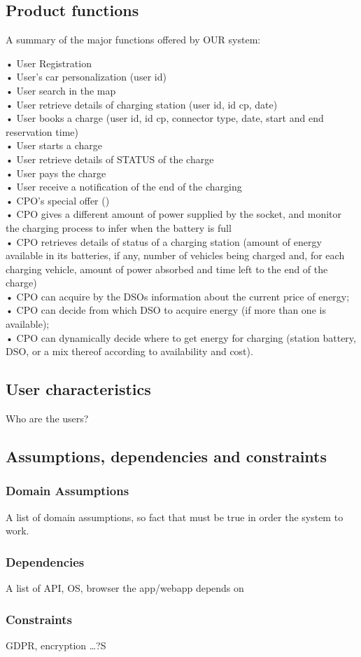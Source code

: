 \subsection{Product functions}
A summary of the major functions offered by OUR system:

• User Registration \\
• User's car personalization  (user id)\\
• User search in the map\\
• User retrieve details of charging station (user id, id cp, date)\\
• User books a charge (user id, id cp, connector type, date, start and end reservation time)\\
• User starts a charge\\
• User retrieve details of STATUS of the charge\\
• User pays the charge \\
• User receive a notification of the end of the charging\\
• CPO's special offer ()\\
• CPO gives a different amount of power supplied by the socket, and monitor
the charging process to infer when the battery is full\\
• CPO retrieves details of status of a charging station (amount of energy available 
in its batteries, if any, number of vehicles being charged and, for each charging vehicle, amount of power
absorbed and time left to the end of the charge)\\
• CPO can acquire by the DSOs information about the current price of energy;\\
• CPO can decide from which DSO to acquire energy (if more than one is available);\\
• CPO can dynamically decide where to get energy for charging (station battery, DSO, or a mix thereof
according to availability and cost).\\


\subsection{User characteristics}
Who are the users?

\subsection{Assumptions, dependencies and constraints}
\subsubsection*{Domain Assumptions}
A list of domain assumptions, so fact that must be true in order the system to work.
\subsubsection*{Dependencies}
A list of API, OS, browser the app/webapp depends on
\subsubsection*{Constraints}
GDPR, encryption \dots?S
